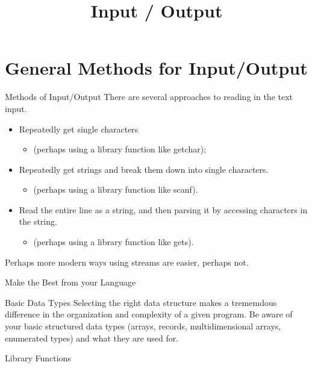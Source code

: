 \documentclass{beamer}
\title{Input / Output}
\begin{document}
\frame{
  \titlepage
}


\section{General Methods for Input/Output}



\begin{frame}[fragile]{Methods of Input/Output}
 There are several approaches to reading in the text input.
 \begin{itemize}
 \item Repeatedly get single characters
   \begin{itemize}
   \item (perhaps using a library function like getchar);
   \end{itemize}
 \item Repeatedly get strings and break them down into single characters.
   \begin{itemize}
   \item (perhaps using a library function like scanf). 
   \end{itemize}
 \item Read the entire line as a string, and then parsing it by accessing characters in the string.
   \begin{itemize}
   \item (perhaps using a library function like gets).
   \end{itemize}
\end{itemize}
Perhaps more modern ways using streams are easier, perhaps not.
\end{frame}


\begin{frame}{Make the Best from your Language}
  
  \begin{block}{Basic Data Types}
    Selecting the right data structure makes a trememdous difference in the organization and complexity of a given program.
    Be aware of your basic structured data types (arrays, records, multidimensional arrays, enumerated types) and what they are used for.
\end{block}

\begin{block}{Library Functions}
  
\end{block}
\end{frame}
\end{document}
